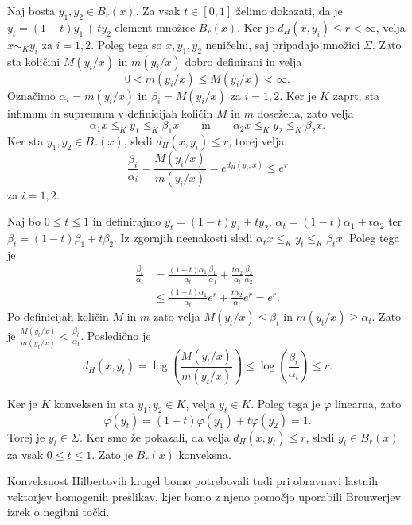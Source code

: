 \documentclass[mat2, tisk]{fmfdelo}
\begin{document}
\begin{dokaz}
Naj bosta $y_1,y_2\in B_r(x)$. 
Za vsak $t \in [0,1]$ želimo dokazati, da je $y_t = (1-t)y_1 + t y_2$ element množice $B_r(x)$.
Ker je $d_H(x,y_i)\leq r<\infty$,
velja $x\sim_K y_i$ za $i=1,2$.
Poleg tega so $x,y_1,y_2$ neničelni,
saj pripadajo množici $\Sigma$.
Zato sta količini $M(y_i/x)$ in $m(y_i/x)$
dobro definirani in velja
\[
0<m(y_i/x)\leq M(y_i/x)<\infty.
\]
Označimo
$\alpha_i=m(y_i/x)$ in $\beta_i=M(y_i/x)$ za $i=1,2$. Ker je $K$
zaprt, sta infimum in supremum v definicijah količin $M$ in $m$
dosežena, zato velja
\begin{equation*}
\alpha_1x\leq_K y_1\leq_K\beta_1x
\qquad\text{in}\qquad
\alpha_2x\leq_K y_2\leq_K\beta_2x.
\end{equation*}
Ker sta $y_1,y_2\in B_r(x)$, 
sledi $d_H (x,y_i) \leq r$, torej velja
\begin{equation*}
\frac{\beta_i}{\alpha_i}
=
\frac{M(y_i/x)}{m(y_i/x)}
=
e^{d_H(y_i,x)}
\leq e^r
\end{equation*}
za $i=1,2$.

Naj bo $0\leq t\leq1$ in definirajmo
$y_t=(1-t)y_1+ty_2$,
$\alpha_t=(1-t)\alpha_1+t\alpha_2$ ter
$\beta_t=(1-t)\beta_1+t\beta_2$. Iz zgornjih neenakosti sledi
$\alpha_t x
\leq_K
y_t
\leq_K
\beta_t x$.
Poleg tega je
\begin{align*}
\frac{\beta_t}{\alpha_t}
&=
\frac{(1-t)\alpha_1}{\alpha_t}
\frac{\beta_1}{\alpha_1}
+
\frac{t\alpha_2}{\alpha_t}
\frac{\beta_2}{\alpha_2}\\
&\leq
\frac{(1-t)\alpha_1}{\alpha_t}e^r
+
\frac{t\alpha_2}{\alpha_t}e^r
=
e^r.
\end{align*}
Po definicijah količin $M$ in $m$ zato velja
$M(y_t/x)\leq\beta_t$ in $m(y_t/x)\geq\alpha_t$. 
Zato je $\frac{M(y_t/x)}{m(y_t/x)} \leq \frac{\beta_t}{\alpha_t}$.
Posledično je
\begin{equation*}
d_H(x,y_t)
=
\log\left(\frac{M(y_t/x)}{m(y_t/x)}\right)
\leq
\log\left(\frac{\beta_t}{\alpha_t}\right)
\leq r.
\end{equation*}

Ker je $K$ konveksen in sta $y_1,y_2\in K$,
velja $y_t\in K$.
Poleg tega je $\varphi$ linearna, zato
\[
\varphi(y_t)
=
(1-t)\varphi(y_1)+t\varphi(y_2)
=
1.
\]
Torej je $y_t\in\Sigma$.
Ker smo že pokazali, da velja
$d_H(x,y_t)\leq r$, sledi
$y_t\in B_r(x)$ za vsak $0\leq t\leq1$.
Zato je $B_r(x)$ konveksna.
\end{dokaz}

Konveksnost Hilbertovih krogel bomo potrebovali tudi
pri obravnavi lastnih vektorjev homogenih preslikav,
kjer bomo z njeno pomočjo uporabili Brouwerjev izrek
o negibni točki.
\end{document}
